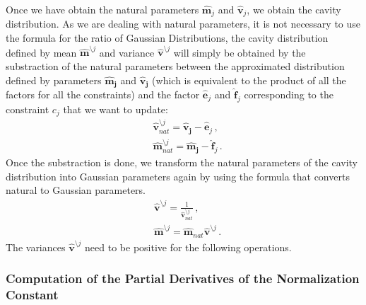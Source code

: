 Once we have obtain the natural parameters $\boldsymbol{\hat{m}}_{j}$ and $\boldsymbol{\hat{v}}_{j}$, we obtain the cavity distribution. As we are dealing with natural parameters, it is not necessary to use the formula for the ratio of Gaussian Distributions, the cavity distribution defined by mean $\boldsymbol{\hat{m}}^{\setminus j}$ and variance $\boldsymbol{\hat{v}}^{\setminus j}$ will simply be obtained by the substraction of the natural parameters between the approximated distribution defined by parameters $\boldsymbol{\hat{m}_{j}}$ and $\boldsymbol{\hat{v}_{j}}$ (which is equivalent to the product of all the factors for all the constraints) and the factor $\boldsymbol{\hat{e}}_{j}$ and $\boldsymbol{\hat{f}}_{j}$ corresponding to the constraint $c_j$ that we want to update:
\begin{align}
& \boldsymbol{\hat{v}}_{nat}^{\setminus j} = \boldsymbol{\hat{v}_{j}} - \boldsymbol{\hat{e}}_{j}\,, \nonumber \\
& \boldsymbol{\hat{m}}_{nat}^{\setminus j} = \boldsymbol{\hat{m}_{j}} - \boldsymbol{\hat{f}}_{j}\,.
\end{align}
Once the substraction is done, we transform the natural parameters of the cavity distribution into Gaussian parameters again by using the formula that converts natural to Gaussian parameters.
\begin{align}
& \boldsymbol{\hat{v}}^{\setminus j} = \frac{1}{\boldsymbol{\hat{v}}_{nat}^{\setminus j}}\,, \nonumber \\
& \boldsymbol{\hat{m}}^{\setminus j} = \boldsymbol{\hat{m}}_{nat} \boldsymbol{\hat{v}}^{\setminus j}\,.
\end{align}
The variances $\boldsymbol{\hat{v}}^{\setminus j}$ need to be positive for the following operations.

\subsubsection{Computation of the Partial Derivatives of the Normalization Constant}

